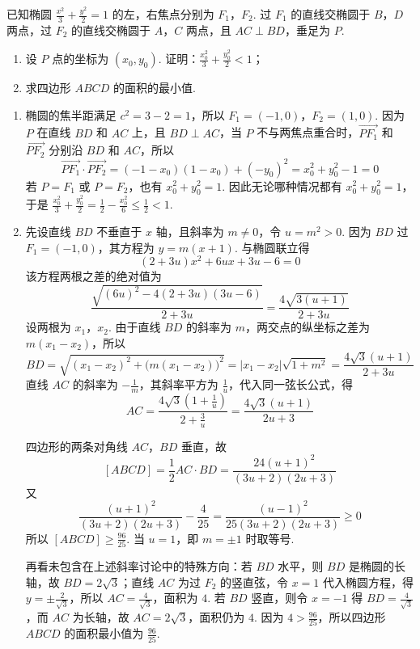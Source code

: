 \begin{problem}
已知椭圆 \(\frac{x^2}{3} + \frac{y^2}{2} = 1\) 的左，右焦点分别为 \(F_1\)，\(F_2\). 过 \(F_1\) 的直线交椭圆于 \(B\)，\(D\) 两点，过 \(F_2\) 的直线交椭圆于 \(A\)，\(C\) 两点，且 \(AC \perp BD\)，垂足为 \(P\).

\begin{enumerate}
\item 设 \(P\) 点的坐标为 \((x_0, y_0)\). 证明：\(\frac{x_0^{2}}{3} + \frac{y_0^{2}}{2} < 1\)；
\item 求四边形 \(ABCD\) 的面积的最小值.
\end{enumerate}
\end{problem}

\begin{solution}
\begin{enumerate}
\item 椭圆的焦半距满足 \(c^2=3-2=1\)，所以
\(F_1=(-1,0)\)，\(F_2=(1,0)\). 因为 \(P\) 在直线 \(BD\) 和 \(AC\) 上，且 \(BD\perp AC\)，当 \(P\) 不与两焦点重合时，\(\overrightarrow{PF_1}\) 和 \(\overrightarrow{PF_2}\) 分别沿 \(BD\) 和 \(AC\)，所以
\[
\overrightarrow{PF_1}\cdot\overrightarrow{PF_2}=(-1-x_0)(1-x_0)+(-y_0)^2=x_0^2+y_0^2-1=0
\]
若 \(P=F_1\) 或 \(P=F_2\)，也有 \(x_0^2+y_0^2=1\). 因此无论哪种情况都有
\(x_0^2+y_0^2=1\)，于是
\(\frac{x_0^2}{3}+\frac{y_0^2}{2}=\frac{1}{2}-\frac{x_0^2}{6}\leqslant\frac{1}{2}<1\).
\item 先设直线 \(BD\) 不垂直于 \(x\) 轴，且斜率为 \(m\ne0\)，令 \(u=m^2>0\). 因为 \(BD\) 过 \(F_1=(-1,0)\)，其方程为 \(y=m(x+1)\). 与椭圆联立得
\[
(2+3u)x^2+6ux+3u-6=0
\]
该方程两根之差的绝对值为
\[
\frac{\sqrt{(6u)^2-4(2+3u)(3u-6)}}{2+3u}=\frac{4\sqrt{3(u+1)}}{2+3u}
\]
设两根为 \(x_1\)，\(x_2\). 由于直线 \(BD\) 的斜率为 \(m\)，两交点的纵坐标之差为 \(m(x_1-x_2)\)，所以
\[
BD=\sqrt{(x_1-x_2)^2+\bigl(m(x_1-x_2)\bigr)^2}
=\left|x_1-x_2\right|\sqrt{1+m^2}
=\frac{4\sqrt{3}(u+1)}{2+3u}
\]
直线 \(AC\) 的斜率为 \(-\frac{1}{m}\)，其斜率平方为 \(\frac{1}{u}\)，代入同一弦长公式，得
\[
AC=\frac{4\sqrt{3}\left(1+\frac{1}{u}\right)}{2+\frac{3}{u}}
=\frac{4\sqrt{3}(u+1)}{2u+3}
\]

四边形的两条对角线 \(AC\)，\(BD\) 垂直，故
\[
[ABCD]=\frac{1}{2}AC\cdot BD=\frac{24(u+1)^2}{(3u+2)(2u+3)}
\]
又
\[
\frac{(u+1)^2}{(3u+2)(2u+3)}-\frac{4}{25}
=\frac{(u-1)^2}{25(3u+2)(2u+3)}\geqslant0
\]
所以 \([ABCD]\geqslant\frac{96}{25}\). 当 \(u=1\)，即 \(m=\pm1\) 时取等号.

再看未包含在上述斜率讨论中的特殊方向：若 \(BD\) 水平，则 \(BD\) 是椭圆的长轴，故 \(BD=2\sqrt{3}\)；直线 \(AC\) 为过 \(F_2\) 的竖直弦，令 \(x=1\) 代入椭圆方程，得 \(y=\pm\frac{2}{\sqrt{3}}\)，所以 \(AC=\frac{4}{\sqrt{3}}\)，面积为 \(4\). 若 \(BD\) 竖直，则令 \(x=-1\) 得 \(BD=\frac{4}{\sqrt{3}}\)，而 \(AC\) 为长轴，故 \(AC=2\sqrt{3}\)，面积仍为 \(4\). 因为 \(4>\frac{96}{25}\)，所以四边形 \(ABCD\) 的面积最小值为 \(\frac{96}{25}\).
\end{enumerate}
\end{solution}
